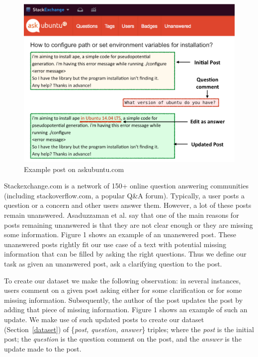 \documentclass[11pt]{article}
\begin{document}
\begin{figure}[!t]
\centering
\includegraphics[scale=0.25]{askubuntu_post}
\caption{Example post on askubuntu.com}
\label{askubuntu_post}
\end{figure}

Stackexchange.com is a network of 150+ online question answering communities (including stackoverflow.com, a popular Q\&A forum). Typically, a user posts a question or a concern and other users answer them. However, a lot of these posts remain unanswered. Asaduzzaman et al.  say that one of the main reasons for posts remaining unanswered is that they are not clear enough or they are missing some information. Figure 1 shows an example of an unanswered post. These unanswered posts rightly fit our use case of a text with potential missing information that can be filled by asking the right questions. Thus we define our task as given an unanswered post, ask a clarifying question to the post. 

To create our dataset we make the following observation: in several instances, users comment on a given post asking either for some clarification or for some missing information. Subsequently, the author of the post updates the post by adding that piece of missing information. Figure 1 shows an example of such an update. We make use of such updated posts to create our dataset (Section~\ref{dataset}) of \{\textit{post, question, answer}\} triples; where the \textit{post} is the initial post; the \textit{question} is the question comment on the post, and the \textit{answer} is the update made to the post. 
\end{document}
